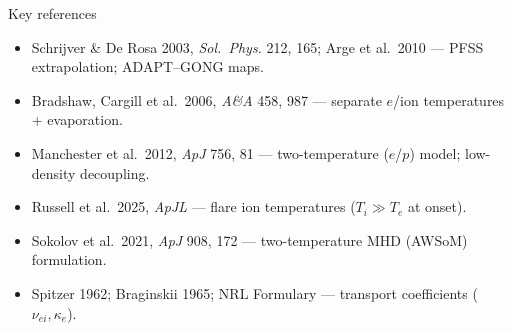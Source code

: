 \documentclass[aspectratio=169]{beamer}
\begin{document}
\begin{frame}[allowframebreaks]{Key references}
\begin{itemize}
    \item Schrijver \& De Rosa 2003, \emph{Sol.\ Phys.} 212, 165; Arge et al.\ 2010 — PFSS extrapolation; ADAPT--GONG maps.
    \item Bradshaw, Cargill et al.\ 2006, \emph{A\&A} 458, 987 — separate $e$/ion temperatures + evaporation.
    \item Manchester et al.\ 2012, \emph{ApJ} 756, 81 — two-temperature ($e$/$p$) model; low-density decoupling.
    \item Russell et al.\ 2025, \emph{ApJL} — flare ion temperatures ($T_i\gg T_e$ at onset).
    \item Sokolov et al.\ 2021, \emph{ApJ} 908, 172 — two-temperature MHD (AWSoM) formulation.
    \item Spitzer 1962; Braginskii 1965; NRL Formulary — transport coefficients ($\nu_{ei},\kappa_e$).
  \end{itemize}
\end{frame}
\end{document}
